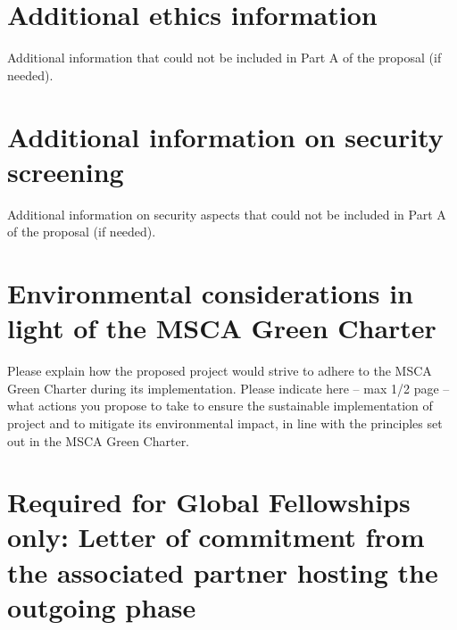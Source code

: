 \documentclass[12pt,draftproposal]{msca-pf}
\begin{document}
\section{Additional ethics information}
\label{sc:ethics}

\begin{mscaexplanation}
Additional information that could not be included in Part A of the proposal (if needed).
\end{mscaexplanation}

\section{Additional information on security screening}
\label{sc:security}

\begin{mscaexplanation}
Additional information on security aspects that could not be included in Part
A of the proposal (if needed).
\end{mscaexplanation}

\section{Environmental considerations in light of the MSCA Green Charter}
\label{sc:environment}

\begin{mscaexplanation}
Please explain how the proposed project would strive to adhere to the MSCA Green
Charter\footnotemark{} during its implementation. Please indicate here --
max 1/2 page -- what actions you propose to take to ensure the sustainable
implementation of project and to mitigate its environmental impact, in line
with the principles set out in the MSCA Green Charter.

\end{mscaexplanation}

\section{
    Required for Global Fellowships only: Letter of commitment from the
    associated partner hosting the outgoing phase}
\label{sc:commitment_letter}
\end{document}
